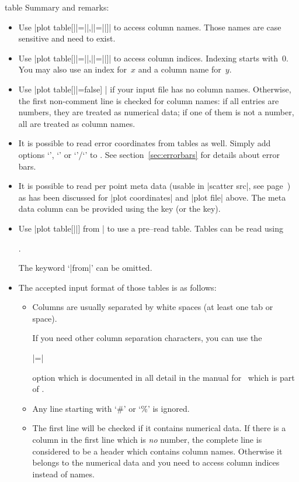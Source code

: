 \begin{addplotoperation}[]{table}{}
Summary and remarks:
\begin{itemize}
	\item Use |plot table[||=||,||=||]| to access column names. Those names are case sensitive and need to exist.
	\item Use |plot table[||=||,||=||]| to access column indices. Indexing starts with~$0$. You may also use an index for~$x$ and a column name for~$y$.
	\item Use |plot table[||=false] | if your input file has no column names. Otherwise, the first non-comment line is checked for column names: if all entries are numbers, they are treated as numerical data; if one of them is not a number, all are treated as column names.
	\item It is possible to read error coordinates from tables as well. Simply add options `', `' or `'/`' to . See section~\ref{sec:errorbars} for details about error bars.
	\item It is possible to read per point meta data (usable in |scatter src|, see page~\pageref{pgfplots:scatter:src}) as has been discussed for |plot coordinates| and |plot file| above. The meta data column can be provided using the  key (or the  key).
	\item Use |plot table[||] from | to use a pre--read table. Tables can be read using
\begin{codeexample}
\macroname.
\end{codeexample}
		The keyword `|from|' can be omitted.

	\item The accepted input format of those tables is as follows:
		\begin{itemize}
			\item Columns are usually separated by white spaces (at least one tab or space).

			 If you need other column separation characters, you can use the 

			|=| 

			option which is documented in all detail in the manual for \PGFPlotstable\ which is part of \PGFPlots.
			\item Any line starting with `\#' or `\%' is ignored.
			\item The first line will be checked if it contains numerical data. If there is a column in the first line which is \emph{no} number, the complete line is considered to be a header which contains column names. Otherwise it belongs to the numerical data and you need to access column indices instead of names.


\end{itemize}
\end{itemize}
\end{addplotoperation}
